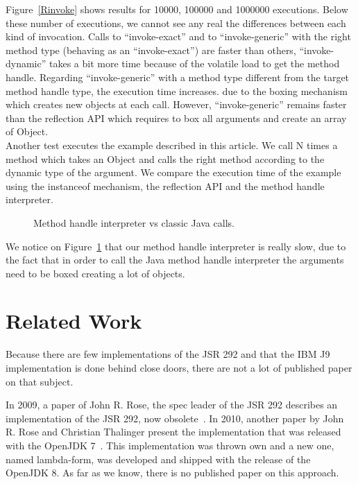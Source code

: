 \documentclass{sig-alternate}
\def \Jsr{JSR\xspace}
\def \JSR{\Jsr 292\xspace}
\begin{document}
  Figure~\ref{Rinvoke} shows results for 10000, 100000 and 1000000 executions.
  Below these number of executions, we cannot see any real the differences between each kind of invocation.
  Calls to ``invoke-exact'' and to ``invoke-generic'' with the right method type (behaving as an ``invoke-exact'') are faster than others,
  ``invoke-dynamic'' takes a bit more time because of the volatile load to get the method handle.
  Regarding ``invoke-generic'' with a method type different from the target method handle type, the execution time increases.
  due to the boxing mechanism which creates new objects at each call.
  However, ``invoke-generic'' remains faster than the reflection API which requires to box all arguments and create an array of Object.\\
  
  Another test executes the example described in this article.
  We call N times a method which takes an Object and calls the right method according to the dynamic type of the argument.
  We compare the execution time of the example using the instanceof mechanism, the reflection API and the method handle interpreter.

  \begin{figure}[!ht]
    \resizebox{\linewidth}{!}{}
    \caption{Method handle interpreter vs classic Java calls.}\vspace{-1em}
    \label{Rmutable}
  \end{figure}

  We notice on Figure~\ref{Rmutable} that our method handle interpreter is really slow,
  due to the fact that in order to call the Java method handle interpreter the arguments need to be boxed creating a lot of objects.

\section{Related Work}
  Because there are few implementations of the \JSR and that the IBM J9 implementation is done behind close doors,
  there are not a lot of published paper on that subject.

  In 2009, a paper of John R. Rose, the spec leader of the \JSR describes an implementation of the \JSR,
  now obsolete~\cite{vmil-rose-indy-2009}. In 2010, another paper by John R. Rose and Christian Thalinger present the implementation
  that was released with the OpenJDK 7~\cite{pppj-rose-indy-2010}. This implementation was thrown own and a new one, named lambda-form,
  was developed and shipped with the release of the OpenJDK 8. As far as we know, there is no published paper on this approach.
\end{document}
